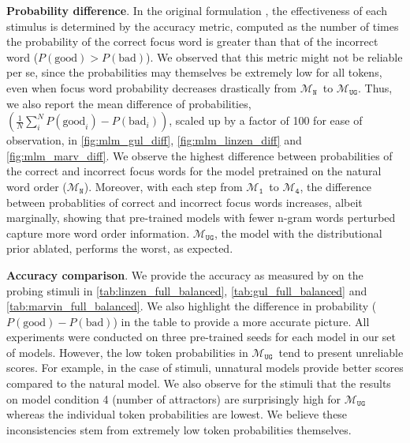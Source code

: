 \documentclass[letterpaper, 12pt]{report}
\newcommand{\xhdr}[1]{{\noindent\bfseries #1}.}
\newcommand{\OR}{$\mathcal{M}_{\texttt{N}}$}
\newcommand{\RI}{$\mathcal{M}_{\texttt{1}}$}
\newcommand{\RIV}{$\mathcal{M}_{\texttt{4}}$}
\newcommand{\RC}{$\mathcal{M}_{\texttt{UG}}$}
\begin{document}
\xhdr{Probability difference} In the original formulation \citep{goldberga, wolf2019}, the effectiveness of each stimulus is determined by the accuracy metric, computed as the number of times the probability of the correct focus word is greater than that of the incorrect word ($P(\textrm{good}) > P(\textrm{bad})$). We observed that this metric might not be reliable per se, since the probabilities may themselves be extremely low for all tokens, even when focus word probability decreases drastically from \OR\ to \RC.
Thus, we also report the mean difference of probabilities, $(\frac{1}{N}\sum_{i}^N P(\textrm{good}_i) - P(\textrm{bad}_i))$, scaled up by a factor of 100 for ease of observation, in \autoref{fig:mlm_gul_diff}, \autoref{fig:mlm_linzen_diff} and \autoref{fig:mlm_marv_diff}.
We observe the highest difference between probabilities of the correct and incorrect focus words for the model pretrained on the natural word order (\OR). Moreover, with each step from \RI\ to \RIV, the difference between probablities of correct and incorrect focus words increases, albeit marginally, showing that pre-trained models with fewer n-gram words perturbed capture more word order information. \RC, the model with the distributional prior ablated, performs the worst, as expected.





\xhdr{Accuracy comparison}
We provide the accuracy as measured by \citet{goldberga, wolf2019} on the probing stimuli in \autoref{tab:linzen_full_balanced}, \autoref{tab:gul_full_balanced} and \autoref{tab:marvin_full_balanced}. We also highlight the difference in probability ($P(\textrm{good}) - P(\textrm{bad})$) in the table to provide a more accurate picture. All experiments were conducted on three pre-trained seeds for each model in our set of models. However, the low token probabilities in \RC\ tend to present unreliable scores. For example, in the case of \citet{gulordava2018} stimuli, unnatural models provide better scores compared to the natural model. We also observe for the \citet{linzen-etal-2016-assessing} stimuli that the results on model condition 4 (number of attractors) are surprisingly high for \RC\, whereas the individual token probabilities are lowest. We believe these inconsistencies stem from extremely low token probabilities themselves.  %
\end{document}
